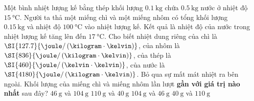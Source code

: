 \begin{ex}
	Một bình nhiệt lượng kế bằng thép khối lượng $\SI{0.1}{\kilogram}$ chứa $\SI{0.5}{\kilogram}$ nước ở nhiệt độ $\SI{15}{\celsius}$. Người ta thả một miếng chì và một miếng nhôm có tổng khối lượng $\SI{0.15}{\kilogram}$ và nhiệt độ $\SI{100}{\celsius}$ vào nhiệt lượng kế. Kết quả là nhiệt độ của nước trong nhiệt lượng kế tăng lên đến $\SI{17}{\celsius}$. Cho biết nhiệt dung riêng của chì là $\SI{127.7}{\joule/\left(
		\kilogram\cdot\kelvin\right)}$, của nhôm là $\SI{836}{\joule/\left(\kilogram\cdot\kelvin\right)}$, của thép là $\SI{460}{\joule/\left(\kelvin\cdot\kelvin\right)}$, của nước là $\SI{4180}{\joule/\left(\kilogram\cdot\kelvin\right)}$. Bỏ qua sự mất mát nhiệt ra bên ngoài. Khối lượng của miếng chì và miếng nhôm lần lượt \textbf{gần với giá trị nào nhất} sau đây?
	\choice
	{$\SI{46}{\gram}$ và $\SI{104}{\gram}$}
	{$\SI{110}{\gram}$ và $\SI{40}{\gram}$}
	{\True $\SI{104}{\gram}$ và $\SI{46}{\gram}$}
	{$\SI{40}{\gram}$ và $\SI{110}{\gram}$}
\end{ex}

